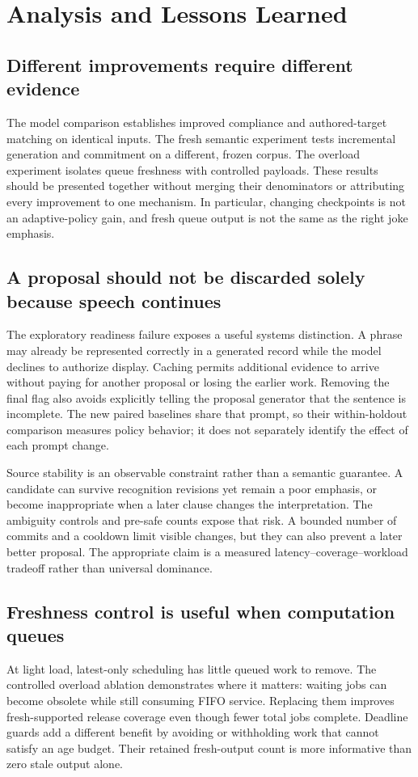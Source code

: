 \section{Analysis and Lessons Learned}
\subsection{Different improvements require different evidence}
The model comparison establishes improved compliance and authored-target matching on identical inputs. The fresh semantic experiment tests incremental generation and commitment on a different, frozen corpus. The overload experiment isolates queue freshness with controlled payloads. These results should be presented together without merging their denominators or attributing every improvement to one mechanism. In particular, changing checkpoints is not an adaptive-policy gain, and fresh queue output is not the same as the right joke emphasis.

\subsection{A proposal should not be discarded solely because speech continues}
The exploratory readiness failure exposes a useful systems distinction. A phrase may already be represented correctly in a generated record while the model declines to authorize display. Caching permits additional evidence to arrive without paying for another proposal or losing the earlier work. Removing the final flag also avoids explicitly telling the proposal generator that the sentence is incomplete. The new paired baselines share that prompt, so their within-holdout comparison measures policy behavior; it does not separately identify the effect of each prompt change.

Source stability is an observable constraint rather than a semantic guarantee. A candidate can survive recognition revisions yet remain a poor emphasis, or become inappropriate when a later clause changes the interpretation. The ambiguity controls and pre-safe counts expose that risk. A bounded number of commits and a cooldown limit visible changes, but they can also prevent a later better proposal. The appropriate claim is a measured latency--coverage--workload tradeoff rather than universal dominance.

\subsection{Freshness control is useful when computation queues}
At light load, latest-only scheduling has little queued work to remove. The controlled overload ablation demonstrates where it matters: waiting jobs can become obsolete while still consuming FIFO service. Replacing them improves fresh-supported release coverage even though fewer total jobs complete. Deadline guards add a different benefit by avoiding or withholding work that cannot satisfy an age budget. Their retained fresh-output count is more informative than zero stale output alone.

